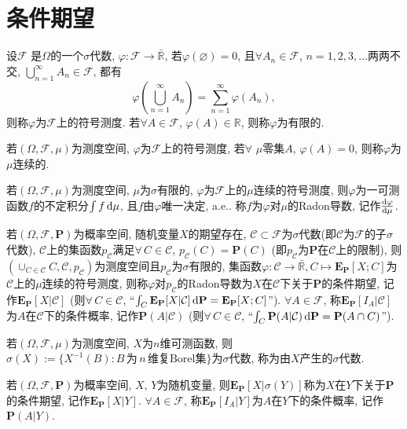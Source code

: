 \chapter{条件期望}

\def\F{\mathcal{F}}
\begin{definition}
    设$\F$ 是$\Omega$的一个$\sigma$代数, $\varphi\colon \F\to\bar{\mathbb{R} }$, 若$\varphi(\varnothing )=0$, 且$\forall A_n\in\F$, $n=1,2,3,\dots$两两不交, $\bigcup_{n=1}^{\infty}A_n\in\F$, 都有\begin{equation*}
        \varphi\left(\bigcup_{n=1}^{\infty}A_n\right)=\sum_{n=1}^{\infty}\varphi\left(A_n\right),
    \end{equation*}则称$\varphi$为$\F$上的符号测度. 若$\forall A\in\F$, $\varphi(A)\in\mathbb{R}$, 则称$\varphi$为有限的.
\end{definition}

\def\s{$(\Omega,\F,\mu)$}
\def\R{\mathbb{R}}
\begin{definition}
    若\s{}为测度空间, $\varphi$为$\F$上的符号测度, 若$\forall$ $\mu$零集$A$, $\varphi(A)=0$, 则称$\varphi$为$\mu$连续的.
\end{definition}

\begin{definition}
    若\s{}为测度空间, $\mu$为$\sigma$有限的, $\varphi$为$\F$上的$\mu$连续的符号测度, 则$\varphi$为一可测函数$f$的不定积分$\int f\,\mathrm{d}\mu$, 且$f$由$\varphi$唯一决定, a.e.. 称$f$为$\varphi$对$\mu$的Radon导数, 记作$\frac{\mathrm{d} \varphi}{\mathrm{d}\mu}$.
\end{definition}

\def\P{\mathbf{P}}
\def\E{\mathbf{E}}
\def\C{\mathcal{C}}
\begin{definition}
    若$(\Omega,\F,\P)$为概率空间, 随机变量$X$的期望存在, $\C\subset\F$为$\sigma$代数(即$\C$为$\F$的子$\sigma$代数), $\C$上的集函数$p_\C$满足$\forall\,C\in\C$, $p_\C(C)=\P(C)$ (即$p_\C$为$\P$在$\C$上的限制), 则$(\cup_{C\in\C}C,\C,p_\C)$为测度空间且$p_\C$为$\sigma$有限的, 集函数$\varphi\colon \C\to\bar{\R},C\mapsto\E_\P[X;C]$为$\C$上的$\mu$连续的符号测度, 则称$\varphi$对$p_\C$的Radon导数为$X$在$\C$下关于$\P$的条件期望, 记作$\E_\P[X|\C]$ (则$\forall\,C\in\C$, ``$\int_C\E_\P[X|\C]\,\d\P=\E_\P[X;C]$''). $\forall A\in\F$, 称$\E_\P[I_A|\C]$为$A$在$\C$下的条件概率, 记作$\P(A|\C)$ (则$\forall\,C\in\C$, ``$\int_C\P(A|\C)\,\d\P=\P(A\cap C)$'').
\end{definition}

\begin{definition}
    若$(\Omega,\mathcal{F},\mu)$为测度空间, $X$为$n$维可测函数, 则$\sigma(X):=\{X^{-1}(B)\colon B\,\text{为}\,n\,\text{维复Borel集}\}$为$\sigma$代数, 称为由$X$产生的$\sigma$代数.
\end{definition}

\begin{definition}
    若$(\Omega,\F,\P)$为概率空间, $X$, $Y$为随机变量, 则$\E_\P[X|\sigma(Y)]$称为$X$在$Y$下关于$\P$的条件期望, 记作$\E_\P[X|Y]$. $\forall A\in\F$, 称$\E_\P[I_A|Y]$为$A$在$Y$下的条件概率, 记作$\P(A|Y)$.
\end{definition}
